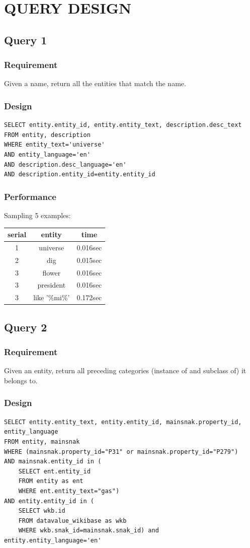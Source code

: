 \documentclass[12pt]{article}
\begin{document}
\section{QUERY DESIGN}
\subsection{Query 1}
\subsubsection{Requirement}
Given a name, return all the entities that match the name.
\subsubsection{Design}
\lstset{language=SQL}
\begin{lstlisting}
SELECT entity.entity_id, entity.entity_text, description.desc_text
FROM entity, description 
WHERE entity_text='universe'
AND entity_language='en'
AND description.desc_language='en'
AND description.entity_id=entity.entity_id
\end{lstlisting}
\subsubsection{Performance}
Sampling 5 examples:
\begin{center}
  \begin{tabular}{ | c | c | c |}
    \hline
    serial & entity & time \\ \hline\hline
    1 & universe & 0.016sec \\ \hline
    2 & dig & 0.015sec \\ \hline
    3 & flower & 0.016sec \\ \hline
    3 & president & 0.016sec \\ \hline
    3 & like '\%mi\%' & 0.172sec \\
    \hline
  \end{tabular}
\end{center}
\subsection{Query 2}
\subsubsection{Requirement}
Given an entity, return all preceding categories (instance of and subclass of) it belongs to.
\subsubsection{Design}
\lstset{language=SQL}
\begin{lstlisting}
SELECT entity.entity_text, entity.entity_id, mainsnak.property_id, entity_language
FROM entity, mainsnak
WHERE (mainsnak.property_id="P31" or mainsnak.property_id="P279")
AND mainsnak.entity_id in (
	SELECT ent.entity_id 
    FROM entity as ent 
    WHERE ent.entity_text="gas")
AND entity.entity_id in (
	SELECT wkb.id 
    FROM datavalue_wikibase as wkb 
    WHERE wkb.snak_id=mainsnak.snak_id) and entity.entity_language='en'
\end{lstlisting}
\end{document}
